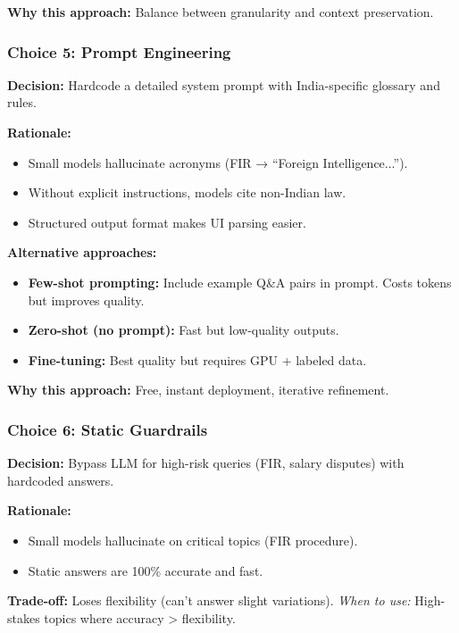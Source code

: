 \documentclass[11pt,a4paper]{article}
\begin{document}
\textbf{Why this approach:} Balance between granularity and context preservation.

\subsubsection{Choice 5: Prompt Engineering}

\textbf{Decision:} Hardcode a detailed system prompt with India-specific glossary and rules.

\textbf{Rationale:}
\begin{itemize}
\item Small models hallucinate acronyms (FIR → ``Foreign Intelligence...'').
\item Without explicit instructions, models cite non-Indian law.
\item Structured output format makes UI parsing easier.
\end{itemize}

\textbf{Alternative approaches:}
\begin{itemize}
\item \textbf{Few-shot prompting:} Include example Q\&A pairs in prompt. Costs tokens but improves quality.
\item \textbf{Zero-shot (no prompt):} Fast but low-quality outputs.
\item \textbf{Fine-tuning:} Best quality but requires GPU + labeled data.
\end{itemize}

\textbf{Why this approach:} Free, instant deployment, iterative refinement.

\subsubsection{Choice 6: Static Guardrails}

\textbf{Decision:} Bypass LLM for high-risk queries (FIR, salary disputes) with hardcoded answers.

\textbf{Rationale:}
\begin{itemize}
\item Small models hallucinate on critical topics (FIR procedure).
\item Static answers are 100\% accurate and fast.
\end{itemize}

\textbf{Trade-off:} Loses flexibility (can't answer slight variations). \textit{When to use:} High-stakes topics where accuracy > flexibility.
\end{document}
